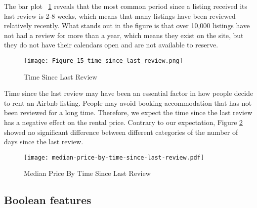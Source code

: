 The bar plot ~\ref{fig:time_since_last_review} reveals that the most
common period since a listing received its last review is 2-8 weeks, which means
that many listings have been reviewed relatively recently.  What stands out in
the figure is that over 10,000 listings have not had a review for more than a
year, which means they exist on the site, but they do not have their calendars
open and are not available to reserve.

\begin{figure}[H]\centering
    \texttt{[image: Figure\_15\_time\_since\_last\_review.png]}
    \caption{Time Since Last Review}
    \label{fig:time_since_last_review}
\end{figure}

Time since the last review may have been an essential factor in how people
decide to rent an Airbnb listing. People may avoid booking accommodation that
has not been reviewed for a long time. Therefore, we expect the time since the
last review has a negative effect on the rental price. Contrary to our
expectation, Figure \ref{fig:time_since_last_review_price} showed no significant
difference between different categories of the number of days since the last
review.

\begin{figure}[H]\centering
    \texttt{[image: median-price-by-time-since-last-review.pdf]}
        \caption{Median Price By Time Since Last Review}
        \label{fig:time_since_last_review_price}
\end{figure}


\subsection{Boolean features}
\label{sec:boolean_features}

